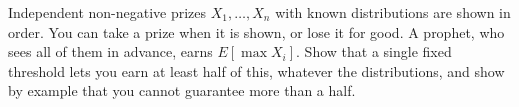 \begin{question}\label{iq:iv1:optimal-stopping:20}
Independent non-negative prizes $X_1, \dots, X_n$ with known distributions are shown in order. You can take a prize when it is shown, or lose it for good. A prophet, who sees all of them in advance, earns $E[\max X_i]$. Show that a single fixed threshold lets you earn at least half of this, whatever the distributions, and show by example that you cannot guarantee more than a half.
\end{question}

